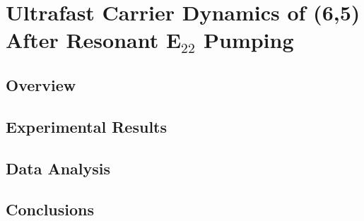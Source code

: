 \chapter{Ultrafast Carrier Dynamics of (6,5) After Resonant E$_{22}$ Pumping}

\section{Overview}

\section{Experimental Results}


\section{Data Analysis}

\section{Conclusions}